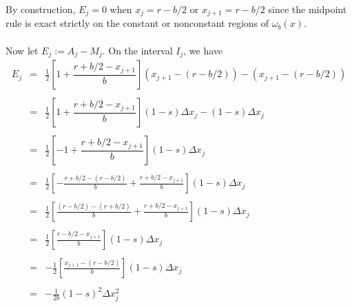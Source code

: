 \documentclass{article}
\begin{document}
\noindent
By construction, $E_j = 0$ when $x_j = r - b/2$ or $x_{j+1} = r - b/2$ since the midpoint rule is exact strictly on the constant or nonconstant regions of $\omega_b(x)$.
\\
\\
Now let $E_j := A_j - M_j$. On the interval $I_j$, we have
\[
    \begin{array}{rcl}
    E_j &=& \displaystyle
            \frac{1}{2} \left[
                1 + \dfrac{r + b/2 - x_{j+1}}{b}
            \right] (x_{j+1} - (r - b/2)) -
            (x_{j+1} - (r-b/2)) \\
        & &	\\
        &=& \displaystyle
            \frac{1}{2} \left[
            1 + \dfrac{r + b/2 - x_{j+1}}{b}
            \right] (1 - s)\Delta x_j -
            (1 - s)\Delta x_j \\
        & &	\\
        &=& \displaystyle
            \frac{1}{2} \left[
                -1 + \dfrac{r + b/2 - x_{j+1}}{b}
            \right] (1 - s)\Delta x_j \\
        & &	\\
        &=& \displaystyle
            \frac{1}{2} \left[
            -\frac{r + b/2 - (r - b/2)}{b}
            +
            \frac{r + b/2 - x_{j+1}}{b}
            \right] (1 - s)\Delta x_j \\
        & &	\\
        &=& \displaystyle
            \frac{1}{2} \left[
                \frac{(r - b/2) - (r + b/2)}{b}
                +
                \frac{r + b/2 - x_{j+1}}{b}
            \right] (1 - s)\Delta x_j \\
        & &	\\
        &=& \displaystyle
            \frac{1}{2} \left[
                \frac{r - b/2 - x_{j+1}}{b}
            \right] (1 - s)\Delta x_j \\
        & &	\\
        &=& \displaystyle
            -\frac{1}{2} \left[
                \frac{x_{j+1} - (r - b/2)}{b}
            \right] (1 - s)\Delta x_j \\
        & &	\\
        &=& \displaystyle
            -\frac{1}{2b}(1 - s)^2\Delta x_j^2 \\
    \end{array}
\]
\end{document}
